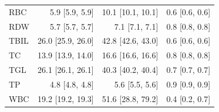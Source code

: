 \begin{table}[ht]
\begin{tabular}{lrrr}
RBC & 5.9 [5.9, 5.9] & 10.1 [10.1, 10.1] & 0.6 [0.6, 0.6] \\
RDW & 5.7 [5.7, 5.7] & 7.1 [7.1, 7.1] & 0.8 [0.8, 0.8] \\
TBIL & 26.0 [25.9, 26.0] & 42.8 [42.6, 43.0] & 0.6 [0.6, 0.6] \\
TC & 13.9 [13.9, 14.0] & 16.6 [16.6, 16.6] & 0.8 [0.8, 0.8] \\
TGL & 26.1 [26.1, 26.1] & 40.3 [40.2, 40.4] & 0.7 [0.7, 0.7] \\
TP & 4.8 [4.8, 4.8] & 5.6 [5.5, 5.6] & 0.9 [0.9, 0.9] \\
WBC & 19.2 [19.2, 19.3] & 51.6 [28.8, 79.2] & 0.4 [0.2, 0.7] \\
\bottomrule
\end{tabular}
\label{tab:08_variability}
\end{table}